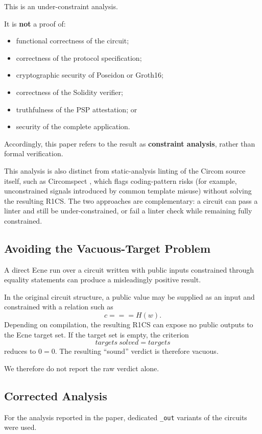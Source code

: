 \documentclass[10pt,twocolumn]{article}
\newcommand{\code}[1]{\texttt{#1}}
\begin{document}
This is an under-constraint analysis.

It is \textbf{not} a proof of:
\begin{itemize}
\item functional correctness of the circuit;
\item correctness of the protocol specification;
\item cryptographic security of Poseidon or Groth16;
\item correctness of the Solidity verifier;
\item truthfulness of the PSP attestation; or
\item security of the complete application.
\end{itemize}
Accordingly, this paper refers to the result as \textbf{constraint
analysis}, rather than formal verification.

This analysis is also distinct from static-analysis linting of the
Circom source itself, such as Circomspect \cite{circomspect}, which
flags coding-pattern risks (for example, unconstrained signals
introduced by common template misuse) without solving the resulting
R1CS. The two approaches are complementary: a circuit can pass a linter
and still be under-constrained, or fail a linter check while remaining
fully constrained.

\subsection{Avoiding the Vacuous-Target Problem}

A direct Ecne run over a circuit written with public inputs constrained
through equality statements can produce a misleadingly positive result.

In the original circuit structure, a public value may be supplied as an
input and constrained with a relation such as
\[
c \mathrel{===} H(w).
\]
Depending on compilation, the resulting R1CS can expose no public
outputs to the Ecne target set. If the target set is empty, the
criterion
\[
\mathit{targets\ solved} = \mathit{targets}
\]
reduces to $0=0$. The resulting ``sound'' verdict is therefore vacuous.

We therefore do not report the raw verdict alone.

\subsection{Corrected Analysis}

For the analysis reported in the paper, dedicated \code{\_out} variants
of the circuits were used.
\end{document}

